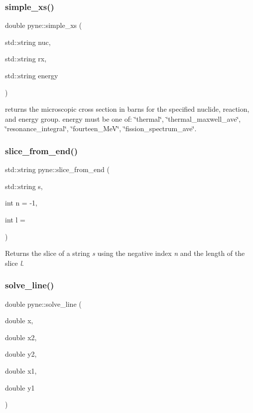 \subsubsection{\texorpdfstring{simple\+\_\+xs()}{simple\_xs()}\hspace{0.1cm}{\footnotesize\ttfamily [4/4]}}
{\footnotesize\ttfamily double pyne\+::simple\+\_\+xs (\begin{DoxyParamCaption}\item[{std\+::string}]{nuc,  }\item[{std\+::string}]{rx,  }\item[{std\+::string}]{energy }\end{DoxyParamCaption})}

returns the microscopic cross section in barns for the specified nuclide, reaction, and energy group. energy must be one of\+: \char`\"{}thermal\char`\"{}, \char`\"{}thermal\+\_\+maxwell\+\_\+ave\char`\"{}, \char`\"{}resonance\+\_\+integral\char`\"{}, \char`\"{}fourteen\+\_\+\+Me\+V\char`\"{}, \char`\"{}fission\+\_\+spectrum\+\_\+ave\char`\"{}. \mbox{\label{namespacepyne_abe1c85ef0d36e8e3eeb02076db773c88}} 
\subsubsection{\texorpdfstring{slice\+\_\+from\+\_\+end()}{slice\_from\_end()}}
{\footnotesize\ttfamily std\+::string pyne\+::slice\+\_\+from\+\_\+end (\begin{DoxyParamCaption}\item[{std\+::string}]{s,  }\item[{int}]{n = {\ttfamily -\/1},  }\item[{int}]{l = {} }\end{DoxyParamCaption})}

Returns the slice of a string {\itshape s} using the negative index {\itshape n} and the length of the slice {\itshape l}. \mbox{\label{namespacepyne_a943fe41cf25ff550684aabffe5971e1e}} 
\subsubsection{\texorpdfstring{solve\+\_\+line()}{solve\_line()}}
{\footnotesize\ttfamily double pyne\+::solve\+\_\+line (\begin{DoxyParamCaption}\item[{double}]{x,  }\item[{double}]{x2,  }\item[{double}]{y2,  }\item[{double}]{x1,  }\item[{double}]{y1 }\end{DoxyParamCaption})}

